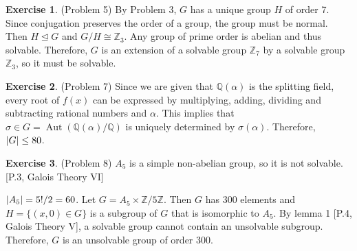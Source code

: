 \documentclass[12pt, psamsfonts]{amsart}
\theoremstyle{definition}
\newtheorem*{exer}{Exercise}
\theoremstyle{remark}
\DeclareMathOperator{\Aut}{Aut}
\numberwithin{equation}{section}
\begin{document}
\begin{exer}{(Problem 5)}
  By Problem 3, $G$ has a unique group $H$ of order 7.
  Since conjugation preserves the order of a group, the group must be normal.
  Then $H \trianglelefteq G$ and $G / H \cong \mathbb{Z}_3$.
  Any group of prime order is abelian and thus solvable.
  Therefore, $G$ is an extension of a solvable group $\mathbb{Z}_7$ by a solvable group $\mathbb{Z}_3$, so it must be solvable.
\end{exer}

\begin{exer}{(Problem 7)}
  Since we are given that $\mathbb{Q}(\alpha)$ is the splitting field, every root of $f(x)$ can be expressed by multiplying, adding, dividing and subtracting rational numbers and $\alpha$.
  This implies that $\sigma \in G = \Aut(\mathbb{Q}(\alpha)/\mathbb{Q})$ is uniquely determined by $\sigma(\alpha)$.
  Therefore, $\abs{G} \leq 80$.

\end{exer}

\begin{exer}{(Problem 8)}
  $A_5$ is a simple non-abelian group, so it is not solvable.
  [P.3, Galois Theory VI]

  $\abs{A_5} = 5! / 2 = 60$.
  Let $G = A_5 \times \mathbb{Z}/5\mathbb{Z}$.
  Then $G$ has 300 elements and $H = \{ (x, 0) \in G \}$ is a subgroup of $G$ that is isomorphic to $A_5$.
  By lemma 1 [P.4, Galois Theory V], a solvable group cannot contain an unsolvable subgroup.
  Therefore, $G$ is an unsolvable group of order 300.
\end{exer}
\end{document}
